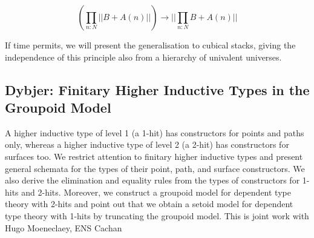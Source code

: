 \documentclass[a4paper,10pt]{scrartcl}
\begin{document}
\[ \left(\prod_{n:N} || B + A(n) ||\right)  \to || \prod_{n:N} B + A(n) || \]

If time permits, we will present the generalisation to cubical stacks, giving the independence of this principle also from a hierarchy of univalent universes.


\subsection*{Dybjer: Finitary Higher Inductive Types in the Groupoid Model}

A higher inductive type of level 1 (a 1-hit) has constructors for points and paths only, whereas a higher inductive type of level 2 (a 2-hit) has constructors for surfaces too. 
We restrict attention to finitary higher inductive types and present general schemata for the types of their point, path, and surface constructors. 
We also derive the elimination and equality rules from the types of constructors for 1-hits and 2-hits. 
Moreover, we construct a groupoid model for dependent type theory with 2-hits and point out that we obtain a setoid model for dependent type theory with 1-hits by truncating the groupoid model.
This is joint work with Hugo Moeneclaey, ENS Cachan
\end{document}
